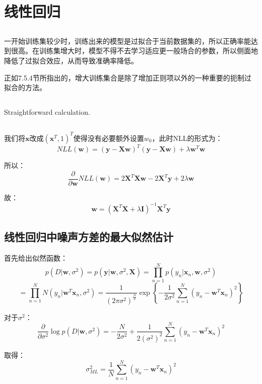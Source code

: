 \documentclass[UTF8]{ctexart}
\begin{document}
\newpage
\section{线性回归}
\subsection{}
一开始训练集较少时，训练出来的模型是过拟合于当前数据集的，所以正确率能达到很高。在训练集增大时，模型不得不去学习适应更一般场合的参数，所以侧面地降低了过拟合效应，从而导致准确率降低。

正如7.5.4节所指出的，增大训练集合是除了增加正则项以外的一种重要的扼制过拟合的方法。

\subsection{}
Straightforward calculation.

\subsection{}
我们将$\textbf{x}$改成$(\textbf{x}^T{},1)^{T}$使得没有必要额外设置$w_{0}$，此时NLL的形式为：
$$NLL(\textbf{w})=(\textbf{y}-\textbf{X}\textbf{w})^{T}(\textbf{y}-\textbf{X}\textbf{w})+\lambda \textbf{w}^{T}\textbf{w}$$

所以：
$$\frac{\partial}{\partial \textbf{w}}NLL(\textbf{w})=2\textbf{X}^{T}\textbf{X}\textbf{w}-2\textbf{X}^{T}\textbf{y}+2\lambda \textbf{w}$$

故：
$$\textbf{w}=(\textbf{X}^{T}\textbf{X}+\lambda \textbf{I})^{-1}\textbf{X}^{T}\textbf{y}$$

\subsection{线性回归中噪声方差的最大似然估计}
首先给出似然函数：
$$p(D|\textbf{w},\sigma^{2})=p(\textbf{y}|\textbf{w},\sigma^{2},\textbf{X})=\prod_{n=1}^{N}p(y_{n}|\textbf{x}_{n},\textbf{w},\sigma^{2})$$
$$=\prod_{n=1}^{N}N(y_{n}|\textbf{w}^{T}\textbf{x}_{n},\sigma^{2})=\frac{1}{(2\pi\sigma^{2})^{\frac{N}{2}}}\exp\left\{ -\frac{1}{2\sigma^{2}}\sum_{n=1}^{N}(y_{n}-\textbf{w}^{T}\textbf{x}_{n})^{2} \right\}$$

对于$\sigma^{2}$：
$$\frac{\partial}{\partial \sigma^{2}}\log p(D|\textbf{w},\sigma^{2}) = -\frac{N}{2\sigma^{2}}+\frac{1}{2(\sigma^{2})^{2}}\sum_{n=1}^{N}(y_{n}-\textbf{w}^{T}\textbf{x}_{n})^{2}$$

取得：
$$\sigma^{2}_{ML}=\frac{1}{N}\sum_{n=1}^{N}(y_{n}-\textbf{w}^{T}\textbf{x}_{n})^{2}$$
\end{document}
